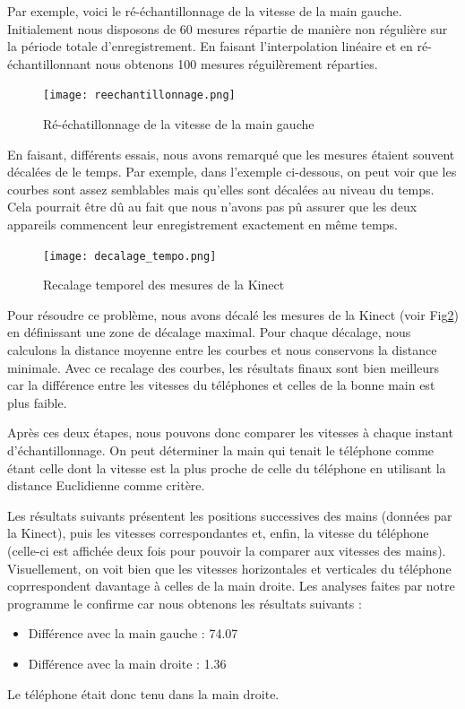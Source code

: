 \documentclass[12pt, french]{article}
\begin{document}
Par exemple, voici le ré-échantillonnage de la vitesse de la main gauche. Initialement nous disposons de 60 mesures répartie de manière non régulière sur la période totale d'enregistrement. En faisant l'interpolation linéaire et en ré-échantillonnant nous obtenons 100 mesures réguilèrement réparties.

\begin{figure}[h]
\centering
\texttt{[image: reechantillonnage.png]}
\caption{Ré-échatillonnage de la vitesse de la main gauche}
\label{fig10}
\end{figure}

\newpage

En faisant, différents essais, nous avons remarqué que les mesures étaient souvent décalées de le temps. Par exemple, dans l'exemple ci-dessous, on peut voir que les courbes sont assez semblables mais qu'elles sont décalées au niveau du temps. Cela pourrait être dû au fait que nous n'avons pas pû assurer que les deux appareils commencent leur enregistrement exactement en même temps.

\begin{figure}[H]
\centering
\texttt{[image: decalage\_tempo.png]}
\caption{Recalage temporel des mesures de la Kinect}
\label{fig11}
\end{figure}


Pour résoudre ce problème, nous avons décalé les mesures de la Kinect (voir Fig\ref{fig11}) en définissant une zone de décalage maximal. Pour chaque décalage, nous calculons la distance moyenne entre les courbes et nous conservons la distance minimale. Avec ce recalage des courbes, les résultats finaux sont bien meilleurs car la différence entre les vitesses du téléphones et celles de la bonne main est plus faible.


Après ces deux étapes, nous pouvons donc comparer les vitesses à chaque instant d'échantillonnage. On peut déterminer la main qui tenait le téléphone comme étant celle dont la vitesse est la plus proche de celle du téléphone en utilisant la distance Euclidienne comme critère. 

Les résultats suivants présentent les positions successives des mains (données par la Kinect), puis les vitesses correspondantes et, enfin, la vitesse du téléphone (celle-ci est affichée deux fois pour pouvoir la comparer aux vitesses des mains). Visuellement, on voit bien que les vitesses horizontales et verticales du téléphone coprrespondent davantage à celles de la main droite. Les analyses faites par notre programme le confirme car nous obtenons les résultats suivants : 
\begin{itemize}
\item Différence avec la main gauche : 74.07
\item Différence avec la main droite :  1.36
\end{itemize}
Le téléphone était donc tenu dans la main droite.
\end{document}
